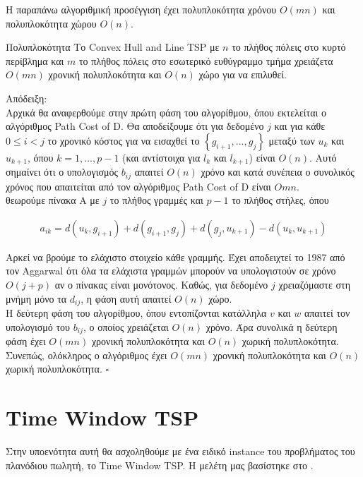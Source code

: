 \documentclass[oneside,12pt]{book}
\theoremstyle{definition}
\begin{document}
Η παραπάνω αλγοριθμική προσέγγιση έχει πολυπλοκότητα χρόνου \(Ο(mn)\) και πολυπλοκότητα χώρου \(Ο(n)\). \\

\begin{mytheorem}{Πολυπλοκότητα}{}
	Το Convex Hull and Line TSP με \(n\) το πλήθος πόλεις στο κυρτό περίβλημα και \(m\) το πλήθος πόλεις στο εσωτερικό ευθύγραμμο τμήμα χρειάζετα \(Ο(mn)\) χρονική πολυπλοκότητα και \(O(n)\) χώρο για να επιλυθεί.
\end{mytheorem}

Απόδειξη: \\
Αρχικά θα αναφερθούμε στην πρώτη φάση του αλγορίθμου, όπου εκτελείται ο αλγόριθμος Path Cost of D. Θα αποδείξουμε ότι για δεδομένο \(j\) και για κάθε \(0 \leq i < j\) το χρονικό κόστος για να εισαχθεί το \(\left\{g_{i+1},...,g_j\right\}\) μεταξύ των \(u_k\) και \(u_{k+1}\), όπου \(k = 1,...,p-1\) (και αντίστοιχα για \(l_k\) και \(l_{k+1}\)) είναι \(Ο(n)\). Αυτό σημαίνει ότι ο υπολογισμός \(b_{ij}\) απαιτεί \(Ο(n)\) χρόνο και κατά συνέπεια ο συνολικός χρόνος που απαιτείται από τον αλγόριθμος Path Cost of D είναι \(Οmn\). \\ 
θεωρούμε πίνακα Α με \(j\) το πλήθος γραμμές και \(p-1\) το πλήθος στήλες, όπου 

\begin{align*}
	a_{ik} = d(u_k, g_{i+1}) + d(g_{i+1}, g_j) + d(g_j,u_{k+1}) - d(u_k, u_{k+1})
\end{align*}

Αρκεί να βρούμε το ελάχιστο στοιχείο κάθε γραμμής. Έχει αποδειχτεί το 1987 από τον Aggarwal ότι όλα τα ελάχιστα γραμμών μπορούν να υπολογιστούν σε χρόνο \(Ο(j+p)\) αν ο πίνακας είναι μονότονος. Καθώς, για δεδομένο \(j\) χρειαζόμαστε στη μνήμη μόνο τα \(d_{ij}\), η φάση αυτή απαιτεί \(Ο(n)\) χώρο. \\
Η δεύτερη φάση του αλγορίθμου, όπου εντοπίζονται κατάλληλα \(v\) και \(w\) απαιτεί τον υπολογισμό του \(b_{ij}\), ο οποίος χρειάζεται \(Ο(n)\) χρόνο. Άρα συνολικά η δεύτερη φάση έχει \(Ο(mn)\) χρονική πολυπλοκότητα και \(Ο(n)\) χωρική πολυπλοκότητα.
Συνεπώς, ολόκληρος ο αλγόριθμος έχει \(Ο(mn)\) χρονική πολυπλοκότητα και \(Ο(n)\) χωρική πολυπλοκότητα. \(\square\) \\

\section{Time Window TSP}

Στην υποενότητα αυτή θα ασχοληθούμε με ένα ειδικό instance του προβλήματος του πλανόδιου πωλητή, το Time Window TSP. Η μελέτη μας βασίστηκε στο \cite{12}. \\
\end{document}
